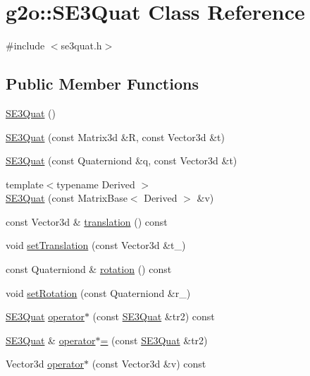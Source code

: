 \hypertarget{classg2o_1_1SE3Quat}{}\section{g2o\+:\+:S\+E3\+Quat Class Reference}
\label{classg2o_1_1SE3Quat}


{\ttfamily \#include $<$se3quat.\+h$>$}

\subsection*{Public Member Functions}
\begin{DoxyCompactItemize}
\item 
\hyperlink{classg2o_1_1SE3Quat_a685de01e417e01f84d5b8389e5f5f333}{S\+E3\+Quat} ()
\item 
\hyperlink{classg2o_1_1SE3Quat_abb3e9184aa02bf6ced3f6d4cd0825f33}{S\+E3\+Quat} (const Matrix3d \&R, const Vector3d \&t)
\item 
\hyperlink{classg2o_1_1SE3Quat_ab22b3fde9b7e0a833b74b3453041c040}{S\+E3\+Quat} (const Quaterniond \&q, const Vector3d \&t)
\item 
{\footnotesize template$<$typename Derived $>$ }\\\hyperlink{classg2o_1_1SE3Quat_ada36ff00a7a238cef3fe958ff9f7f9cd}{S\+E3\+Quat} (const Matrix\+Base$<$ Derived $>$ \&v)
\item 
const Vector3d \& \hyperlink{classg2o_1_1SE3Quat_aefb19225648d06b536e143f7d037a65b}{translation} () const 
\item 
void \hyperlink{classg2o_1_1SE3Quat_aaf12f03b09b2a3a4c9185edcc8b141cb}{set\+Translation} (const Vector3d \&t\+\_\+)
\item 
const Quaterniond \& \hyperlink{classg2o_1_1SE3Quat_a99a34e88f3425dee3d6a9b57c8d265d9}{rotation} () const 
\item 
void \hyperlink{classg2o_1_1SE3Quat_a1f55879ec2e4801d5de4b12b301ff59c}{set\+Rotation} (const Quaterniond \&r\+\_\+)
\item 
\hyperlink{classg2o_1_1SE3Quat}{S\+E3\+Quat} \hyperlink{classg2o_1_1SE3Quat_a5fe6418e503491a65e3730d82704f6f6}{operator$\ast$} (const \hyperlink{classg2o_1_1SE3Quat}{S\+E3\+Quat} \&tr2) const 
\item 
\hyperlink{classg2o_1_1SE3Quat}{S\+E3\+Quat} \& \hyperlink{classg2o_1_1SE3Quat_a0b0c9d2ff23d7e1501bc79a32e958239}{operator$\ast$=} (const \hyperlink{classg2o_1_1SE3Quat}{S\+E3\+Quat} \&tr2)
\item 
Vector3d \hyperlink{classg2o_1_1SE3Quat_a001e7636e553222b559caec4f7da56e4}{operator$\ast$} (const Vector3d \&v) const 

\end{DoxyCompactItemize}
